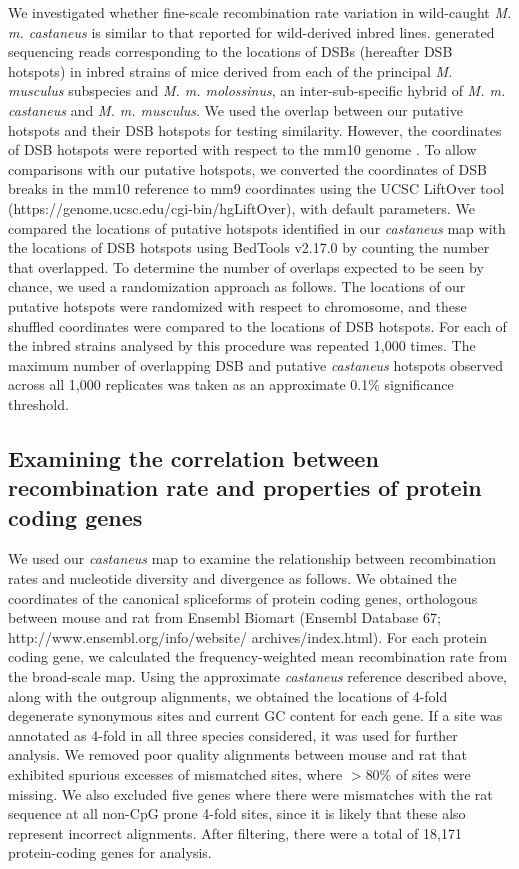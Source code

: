 	We investigated whether fine-scale recombination rate variation in wild-caught \textit{M. m. castaneus} is similar to that reported for wild-derived inbred lines. \cite{RN249} generated sequencing reads corresponding to the locations of DSBs (hereafter DSB hotspots) in inbred strains of mice derived from each of the principal \textit{M. musculus} subspecies and \textit{M. m. molossinus}, an inter-sub-specific hybrid of \textit{M. m. castaneus} and \textit{M. m. musculus}. We used the overlap between our putative hotspots and their DSB hotspots for testing similarity. However, the coordinates of DSB hotspots were reported with respect to the mm10 genome \citep{RN249}. To allow comparisons with our putative hotspots, we converted the coordinates of DSB breaks in the mm10 reference to mm9 coordinates using the UCSC LiftOver tool (https://genome.ucsc.edu/cgi-bin/hgLiftOver), with default parameters. We compared the locations of putative hotspots identified in our \textit{castaneus} map with the locations of DSB hotspots using BedTools v2.17.0 \citep{RN279} by counting the number that overlapped. To determine the number of overlaps expected to be seen by chance, we used a randomization approach as follows. The locations of our putative hotspots were randomized with respect to chromosome, and these shuffled coordinates were compared to the locations of DSB hotspots. For each of the inbred strains analysed by \cite{RN249} this procedure was repeated 1,000 times. The maximum number of overlapping DSB and putative \textit{castaneus} hotspots observed across all 1,000 replicates was taken as an approximate 0.1\% significance threshold.
 
\subsection{Examining the correlation between recombination rate and properties of protein coding genes}

We used our \textit{castaneus} map to examine the relationship between recombination rates and nucleotide diversity and divergence as follows. We obtained the coordinates of the canonical spliceforms of protein coding genes, orthologous between mouse and rat from Ensembl Biomart (Ensembl Database 67; http://www.ensembl.org/info/website/ archives/index.html). For each protein coding gene, we calculated the frequency-weighted mean recombination rate from the broad-scale map. Using the approximate \textit{castaneus} reference described above, along with the outgroup alignments, we obtained the locations of 4-fold degenerate synonymous sites and current GC content for each gene. If a site was annotated as 4-fold in all three species considered, it was used for further analysis. We removed poor quality alignments between mouse and rat that exhibited spurious excesses of mismatched sites, where $>$80\% of sites were missing. We also excluded five genes where there were mismatches with the rat sequence at all non-CpG prone 4-fold sites, since it is likely that these also represent incorrect alignments. After filtering, there were a total of 18,171 protein-coding genes for analysis.

